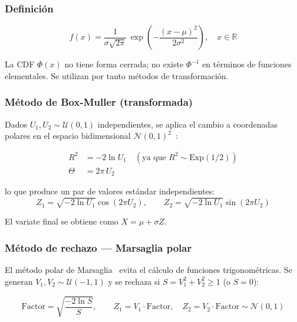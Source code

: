 \documentclass[a4paper, 11pt]{article}
\begin{document}
\subsubsection*{Definición}

\begin{equation}
  f(x) = \frac{1}{\sigma\sqrt{2\pi}}\,
         \exp\!\left(-\frac{(x-\mu)^2}{2\sigma^2}\right), \quad x \in \mathbb{R}
  \label{eq:norm_pdf}
\end{equation}

La CDF $\Phi(x)$ no tiene forma cerrada; no existe $\Phi^{-1}$ en términos de
funciones elementales. Se utilizan por tanto métodos de transformación.

\subsubsection*{Método de Box-Muller (transformada)}

Dados $U_1, U_2 \sim \mathcal{U}(0,1)$ independientes, se aplica el cambio a
coordenadas polares en el espacio bidimensional $\mathcal{N}(0,1)^2$~\cite{boxmuller1958}:

\begin{align}
  R^2 &= -2\ln U_1 \quad (\text{ya que } R^2 \sim \mathrm{Exp}(1/2)) \\
  \Theta &= 2\pi\,U_2
\end{align}

lo que produce un par de valores estándar independientes:
\begin{equation}
  Z_1 = \sqrt{-2\ln U_1}\cos(2\pi U_2), \qquad
  Z_2 = \sqrt{-2\ln U_1}\sin(2\pi U_2)
  \label{eq:boxmuller}
\end{equation}

El variate final se obtiene como $X = \mu + \sigma Z$.

\subsubsection*{Método de rechazo — Marsaglia polar}

El método polar de Marsaglia~\cite{marsaglia1964polar} evita el cálculo de
funciones trigonométricas. Se generan $V_1, V_2 \sim \mathcal{U}(-1,1)$ y se
rechaza si $S = V_1^2 + V_2^2 \geq 1$ (o $S = 0$):

\begin{equation}
  \text{Factor} = \sqrt{\frac{-2\ln S}{S}}, \qquad
  Z_1 = V_1 \cdot \text{Factor}, \quad Z_2 = V_2 \cdot \text{Factor} \sim \mathcal{N}(0,1)
  \label{eq:polar}
\end{equation}
\end{document}
